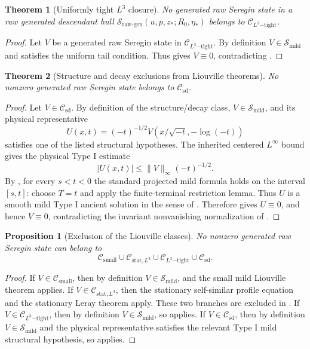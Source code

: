 \documentclass[11pt]{amsart}
\theoremstyle{plain}
\newtheorem{theorem}{Theorem}[section]
\newtheorem{proposition}[proposition]{Proposition}
\theoremstyle{definition}
\theoremstyle{remark}
\numberwithin{equation}{section}
\newcommand{\calS}{\mathcal S}
\newcommand{\calC}{\mathcal C}
\begin{document}
\begin{theorem}[Uniformly tight \(L^3\) closure]
\label{p1:thm:tight-liouville}
No generated raw Seregin state in a raw generated descendant hull
\(\calS_{\mathrm{raw\text{-}gen}}(u,p,z_*;R_0,\eta_*)\) belongs to
\(\calC_{L^3\mathrm{-tight}}\).
\end{theorem}

\begin{proof}
Let \(V\) be a generated raw Seregin state in
\(\calC_{L^3\mathrm{-tight}}\).  By definition
\(V\in\calS_{\mathrm{mild}}\) and satisfies the uniform tail condition.  Thus
 gives \(V\equiv0\), contradicting
.
\end{proof}

\begin{theorem}[Structure and decay exclusions from Liouville theorems]
\label{p1:thm:known-structure-decay-liouville}
No nonzero generated raw Seregin state belongs to
\(\calC_{\mathrm{sd}}\).
\end{theorem}

\begin{proof}
Let \(V\in\calC_{\mathrm{sd}}\).  By definition of the structure/decay class,
\(V\in\calS_{\mathrm{mild}}\), and its physical representative
\[
   U(x,t)=(-t)^{-1/2}V(x/\sqrt{-t},-\log(-t))
\]
satisfies one of the listed structural hypotheses.  The inherited centered
\(L^\infty\) bound gives the physical Type I estimate
\[
   |U(x,t)|\le \|V\|_\infty(-t)^{-1/2}.
\]
By , for every \(s<t<0\) the standard projected
mild formula holds on the interval \([s,t]\): choose \(T=t\) and apply the
finite-terminal restriction lemma.  Thus \(U\) is a smooth mild Type I ancient
solution in the sense of .  Therefore
 gives \(U\equiv0\), and hence
\(V\equiv0\), contradicting the invariant nonvanishing normalization of
.
\end{proof}

\begin{proposition}[Exclusion of the Liouville classes]
\label{p1:prop:known-class-exclusion}
No nonzero generated raw Seregin state can belong to
\[
   \calC_{\mathrm{small}}
   \cup
   \calC_{\mathrm{stat},L^3}
   \cup
   \calC_{L^3\mathrm{-tight}}
   \cup
   \calC_{\mathrm{sd}}.
\]
\end{proposition}

\begin{proof}
If \(V\in\calC_{\mathrm{small}}\), then by definition
\(V\in\calS_{\mathrm{mild}}\), and the small mild Liouville theorem applies.
If \(V\in\calC_{\mathrm{stat},L^3}\), then the stationary self-similar profile
equation and the stationary Leray theorem apply.  These two branches are
excluded in .  If
\(V\in\calC_{L^3\mathrm{-tight}}\), then by definition
\(V\in\calS_{\mathrm{mild}}\), so  applies.  If
\(V\in\calC_{\mathrm{sd}}\), then by definition \(V\in\calS_{\mathrm{mild}}\)
and the physical representative satisfies the relevant Type I mild structural
hypothesis, so  applies.
\end{proof}
\end{document}
